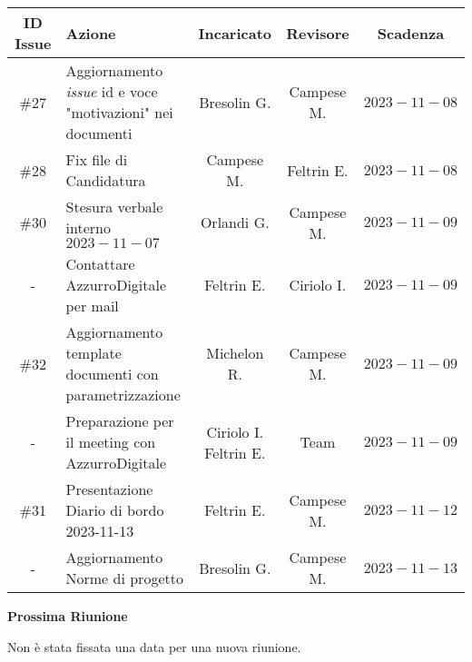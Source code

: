 \documentclass[10pt, a4paper]{article}
\begin{document}
{\renewcommand{\arraystretch}{1.5}
\begin{tabularx}{\textwidth}{c|X|c|c|c}
\textbf{ID Issue} & \textbf{Azione} & \textbf{Incaricato} & \textbf{Revisore} & \textbf{Scadenza} \\
\hline 
\#27 & Aggiornamento \textit{issue} id e voce "motivazioni" nei documenti  & Bresolin G. & Campese M. & $2023-11-08$ \\
\hline
\#28 & Fix file di Candidatura & Campese M. & Feltrin E. & $2023-11-08$ \\
\hline
\#30 & Stesura verbale interno $2023-11-07$ & Orlandi G. & Campese M. & $2023-11-09$ \\
\hline 
- & Contattare AzzurroDigitale per mail & Feltrin E. & Ciriolo I. & $2023-11-09$ \\
\hline
\#32 & Aggiornamento template documenti con parametrizzazione  &  Michelon R. & Campese M. & $2023-11-09$ \\
\hline
- & Preparazione per il meeting con AzzurroDigitale  & \quantities{Ciriolo I.\\Feltrin E.} & Team & $2023-11-09$ \\
\hline
\#31 & Presentazione Diario di bordo 2023-11-13 & Feltrin E. & Campese M. & $2023-11-12$ \\
\hline
- & Aggiornamento Norme di progetto & Bresolin G. & Campese M. & $2023-11-13$ \\
\end{tabularx}}


\newpage
{}

\textbf{Prossima Riunione}

Non è stata fissata una data per una nuova riunione.
\end{document}
